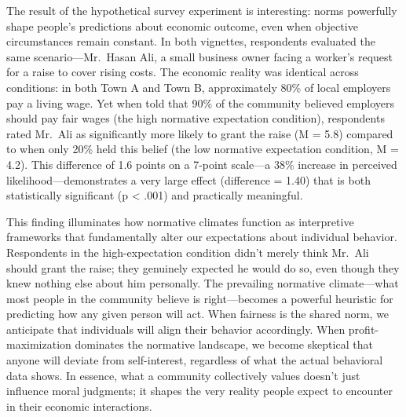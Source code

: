 \documentclass[
  letterpaper,
  DIV=11,
  numbers=noendperiod]{scrreprt}
\begin{document}
The result of the hypothetical survey experiment is interesting: norms
powerfully shape people's predictions about economic outcome, even when
objective circumstances remain constant. In both vignettes, respondents
evaluated the same scenario---Mr.~Hasan Ali, a small business owner
facing a worker's request for a raise to cover rising costs. The
economic reality was identical across conditions: in both Town A and
Town B, approximately 80\% of local employers pay a living wage. Yet
when told that 90\% of the community believed employers should pay fair
wages (the high normative expectation condition), respondents rated
Mr.~Ali as significantly more likely to grant the raise (M = 5.8)
compared to when only 20\% held this belief (the low normative
expectation condition, M = 4.2). This difference of 1.6 points on a
7-point scale---a 38\% increase in perceived likelihood---demonstrates a
very large effect (difference = 1.40) that is both statistically
significant (p \textless{} .001) and practically meaningful.

This finding illuminates how normative climates function as interpretive
frameworks that fundamentally alter our expectations about individual
behavior. Respondents in the high-expectation condition didn't merely
think Mr.~Ali should grant the raise; they genuinely expected he would
do so, even though they knew nothing else about him personally. The
prevailing normative climate---what most people in the community believe
is right---becomes a powerful heuristic for predicting how any given
person will act. When fairness is the shared norm, we anticipate that
individuals will align their behavior accordingly. When
profit-maximization dominates the normative landscape, we become
skeptical that anyone will deviate from self-interest, regardless of
what the actual behavioral data shows. In essence, what a community
collectively values doesn't just influence moral judgments; it shapes
the very reality people expect to encounter in their economic
interactions.
\end{document}

